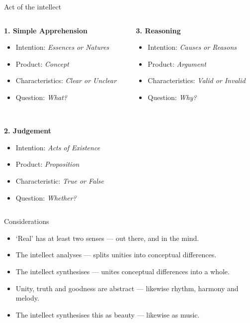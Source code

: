 \documentclass[xcolor=dvipsnames]{beamer}
\begin{document}
\begin{frame}{Act of the intellect}
  \begin{columns}[T] %
    \begin{column}{0.5\textwidth}
\textbf{1. Simple Apprehension}
  \begin{itemize}
  \item Intention: \emph{Essences or Natures}
  \item Product: \emph{Concept}
  \item Characteristics: \emph{Clear or Unclear}
  \item Question: \emph{What?}
  \end{itemize}

  ~

\textbf{2. Judgement}
  \begin{itemize}
  \item Intention: \emph{Acts of Existence}
  \item Product: \emph{Proposition}
  \item Characteristic: \emph{True or False}
  \item Question: \emph{Whether?}
  \end{itemize}
    \end{column}%
    \begin{column}{0.5\textwidth}
\textbf{3. Reasoning}
  \begin{itemize}
  \item Intention: \emph{Causes or Reasons}
  \item Product: \emph{Argument}
  \item Characteristics: \emph{Valid or Invalid}
  \item Question: \emph{Why?}
  \end{itemize}
    \end{column}%
  \end{columns}
\end{frame}


\begin{frame}[fragile]{Considerations}
  \begin{itemize}
  \item `Real' has at least two senses --- out there, and in the mind.\vspace{5mm}
  \item The intellect analyses --- splits unities into conceptual differences.\vspace{5mm}
  \item The intellect synthesises --- unites conceptual differences into a whole.\vspace{5mm}
  \item Unity, truth and goodness are abstract --- likewise rhythm, harmony and melody.\vspace{5mm}
  \item The intellect synthesises this as beauty --- likewise as music.\vspace{5mm}
  \end{itemize}
\end{frame}


\begin{frame}[plain]
  \titlepage
\end{frame}
\end{document}
